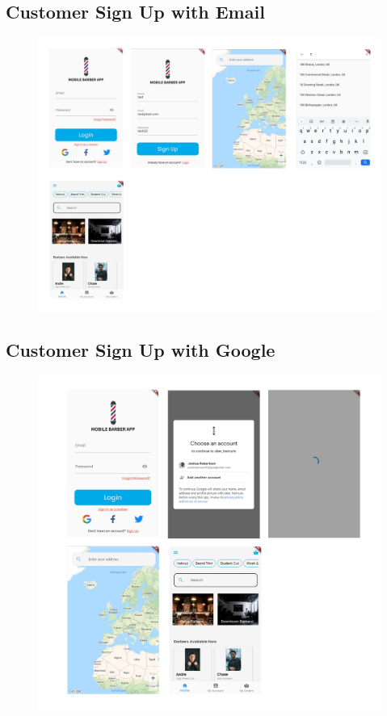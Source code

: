 \documentclass[12pt]{article}
\begin{document}
	\subsection{Customer Sign Up with Email}
	\label{app-image: sign-up-email}
	\begin{figure}[H]
		\centering
		\includegraphics[scale=0.22]{images/sign-up-email.png}
	\end{figure}

	\subsection{Customer Sign Up with Google}
	\label{app-image: sign-up-google}
	\begin{figure}[H]
		\centering
		\includegraphics[scale=0.22]{images/google-signup.png}
	\end{figure}
\end{document}
